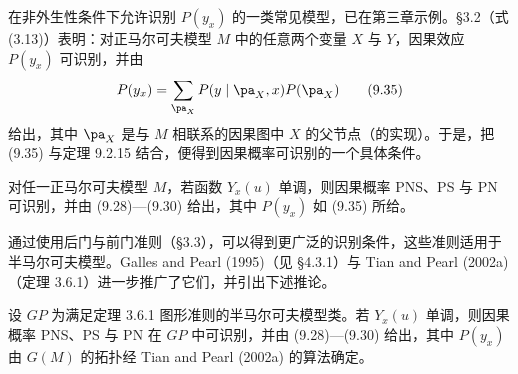 在非外生性条件下允许识别 $P(y_x)$ 的一类常见模型，已在第三章示例。\S 3.2（式 \textup{(3.13)}）表明：对正马尔可夫模型 $M$ 中的任意两个变量 $X$ 与 $Y$，因果效应 $P(y_x)$ 可识别，并由
\begin{equation}
P(y_x)=\sum_{\pa_X}P(y\mid \pa_X,x)P(\pa_X) \tag{9.35}
\end{equation}
给出，其中 $\pa_X$ 是与 $M$ 相联系的因果图中 $X$ 的父节点（的实现）。于是，把 \textup{(9.35)} 与定理 9.2.15 结合，便得到因果概率可识别的一个具体条件。

\begin{corollary}
对任一正马尔可夫模型 $M$，若函数 $Y_x(u)$ 单调，则因果概率 PNS、PS 与 PN 可识别，并由 \textup{(9.28)}—\textup{(9.30)} 给出，其中 $P(y_x)$ 如 \textup{(9.35)} 所给。
\end{corollary}

通过使用后门与前门准则（\S 3.3），可以得到更广泛的识别条件，这些准则适用于半马尔可夫模型。Galles and Pearl (1995)（见 \S 4.3.1）与 Tian and Pearl (2002a)（定理 3.6.1）进一步推广了它们，并引出下述推论。

\begin{corollary}
设 $GP$ 为满足定理 3.6.1 图形准则的半马尔可夫模型类。若 $Y_x(u)$ 单调，则因果概率 PNS、PS 与 PN 在 $GP$ 中可识别，并由 \textup{(9.28)}—\textup{(9.30)} 给出，其中 $P(y_x)$ 由 $G(M)$ 的拓扑经 Tian and Pearl (2002a) 的算法确定。
\end{corollary}
